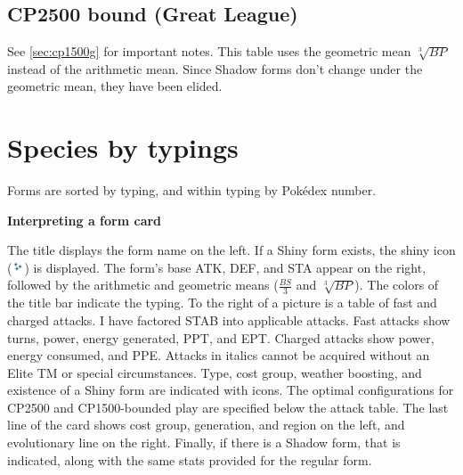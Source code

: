 \documentclass[ebook,10pt,openany,oneside]{memoir}
\begin{document}
\section{CP2500 bound (Great League)\label{sec:cp2500g}}
See \autoref{sec:cp1500g} for important notes.
This table uses the geometric mean $\sqrt[3]{BP}$ instead of the arithmetic mean.
Since Shadow forms don't change under the geometric mean, they have been elided.


\chapter{Species by typings\label{chap:speciesbytype}}
Forms are sorted by typing, and within typing by Pokédex number.

\begin{center}\textbf{Interpreting a form card}\end{center}

The title displays the form name on the left.
If a Shiny form exists, the shiny icon (\includegraphics[height=1em,keepaspectratio]{images/shiny.png}) is displayed.
The form's base ATK, DEF, and STA appear on the right, followed by the arithmetic and geometric means
 ($\frac{BS}{3}$ and $\sqrt[3]{BP}$).
The colors of the title bar indicate the typing.
To the right of a picture is a table of fast and charged attacks.
I have factored STAB into applicable attacks.
Fast attacks show turns, power, energy generated, PPT, and EPT\@.
Charged attacks show power, energy consumed, and PPE\@.
Attacks in italics cannot be acquired without an Elite TM or special circumstances.
Type, cost group, weather boosting, and existence of a Shiny form are indicated with icons.
The optimal configurations for CP2500 and CP1500-bounded play are specified below the attack table.
The last line of the card shows cost group, generation, and region on the left,
 and evolutionary line on the right.
Finally, if there is a Shadow form, that is indicated, along with the same stats
  provided for the regular form.
\end{document}
